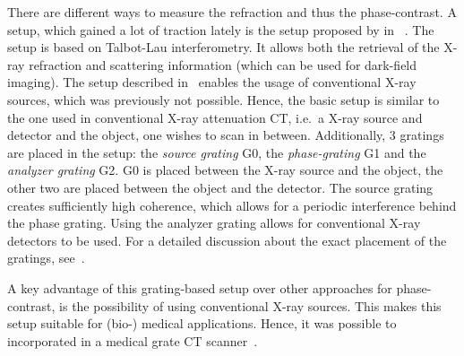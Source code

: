 There are different ways to measure the refraction and thus the phase-contrast. A setup, which
gained a lot of traction lately is the setup proposed by \citeauthor*{pfeiffer_phase_2006} in
~\cite{pfeiffer_phase_2006,pfeiffer_hard-x-ray_2008}. The setup is based on Talbot-Lau
interferometry. It allows both the retrieval of the X-ray refraction and scattering information
(which can be used for dark-field imaging). The setup described in~\cite{pfeiffer_hard-x-ray_2008}
enables the usage of conventional X-ray sources, which was previously not possible. Hence, the basic
setup is similar to the one used in conventional X-ray attenuation CT, i.e.\ a X-ray source and
detector and the object, one wishes to scan in between. Additionally, 3 gratings are placed in the
setup: the \textit{source grating} G0, the \textit{phase-grating} G1 and the \textit{analyzer
grating} G2. G0 is placed between the X-ray source and the object, the other two are placed between
the object and the detector. The source grating creates sufficiently high coherence, which allows
for a periodic interference behind the phase grating. Using the analyzer grating allows for
conventional X-ray detectors to be used. For a detailed discussion about the exact placement of the
gratings, see~\cite{donath_inverse_2009}.

A key advantage of this grating-based setup over other approaches for phase-contrast, is the
possibility of using conventional X-ray sources. This makes this setup suitable for (bio-) medical
applications. Hence, it was possible to incorporated in a medical grate CT
scanner~\cite{viermetz_dark-field_2022}.

